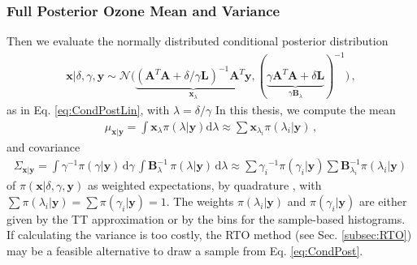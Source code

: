 \subsubsection{Full Posterior Ozone Mean and Variance}
\label{subsec:firstCond}
Then we evaluate the normally distributed conditional posterior distribution
\begin{align}
	\bm{x}| \delta, \gamma, \bm{y}  \sim \mathcal{N}\big( \underbrace{ (\bm{A}^T \bm{A} + \delta / \gamma \bm{L} )^{-1} \bm{A}^T \bm{y}}_{\bm{x}_{\lambda}}, ( \underbrace{ \gamma \bm{A}^T \bm{A} + \delta \bm{L} }_{\gamma \bm{B}_{\lambda}}  )^{-1} \big) \, \label{eq:CondPost},
\end{align}
as in Eq. \ref{eq:CondPostLin}, with $\lambda = \delta / \gamma $
In this thesis, we compute the mean
\begin{align}
	\mu_{\bm{x}|\bm{y}} = \int \bm{x}_{\lambda} \pi(\lambda| \bm{y}) \text{d}\lambda \approx \sum \bm{x}_{\lambda_i} \pi(\lambda_i| \bm{y}) \, , \label{eq:MeanInt}
\end{align} and covariance
\begin{align}
	\Sigma_{\bm{x}|\bm{y}} = \int \gamma^{-1}  \pi(\gamma | \bm{y} ) \, \text{d} \gamma \, \int  \bm{B}_{\lambda}^{-1} \, \pi(\lambda | \bm{y} )  \, \text{d} \lambda  \approx \sum {\gamma_i}^{-1}\pi(\gamma_i| \bm{y}) \sum \bm{B}_{\lambda_i}^{-1}\pi(\lambda_i| \bm{y})\, \label{eq:CovInt}
\end{align}
of $\pi(\bm{x}| \delta, \gamma, \bm{y})$ as weighted expectations, by quadrature \cite[Sec. 2.1]{Dick_Kuo_Sloan_2013}, with $\sum \pi(\lambda_i| \bm{y}) = \sum \pi(\gamma_i| \bm{y}) = 1$.
The weights $\pi(\lambda_i| \bm{y})$ and $\pi(\gamma_i| \bm{y})$ are either given by the TT approximation or by the bins for the sample-based histograms.
If calculating the variance is too costly, the RTO method (see Sec. \ref{subsec:RTO}) may be a feasible alternative to draw a sample from Eq. \ref{eq:CondPost}.


